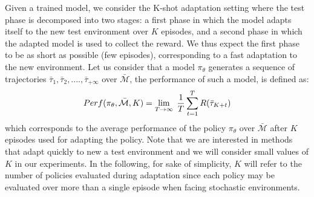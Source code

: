 Given a trained model, we consider the K-shot adaptation setting where the test phase is decomposed into two stages: a first phase in which the model adapts itself to the new test environment over $K$ episodes, and a second phase in which the adapted model is used to collect the reward. We thus expect the first phase to be as short as possible (few episodes), corresponding to a fast adaptation to the new environment. Let us consider that a model $\pi_\theta$ generates a sequence of trajectories $\bar{\tau}_{1}, \bar{\tau}_{2},....,\bar{\tau}_{+\infty}$ over $\bar{\mathcal{M}}$, the performance of such a model, is defined as:
\begin{equation}
    Perf(\pi_\theta,\bar{\mathcal{M}},K) = \underset{T \to \infty}{\lim}\:\:\frac{1}{T}\sum_{t=1}^{T}R(\bar{\tau}_{K+t})  \vspace{-0.15cm} 
\end{equation}    
which corresponds to the average performance of the policy $\pi_\theta$ over $\bar{\mathcal{M}}$ after $K$ episodes used for adapting the policy. Note that we are interested in methods that adapt quickly to new a test environment and we will consider small values of $K$ in our experiments. In the following, for sake of simplicity, $K$ will refer to the number of policies evaluated during adaptation since each policy may be evaluated over more than a single episode when facing stochastic environments. 







